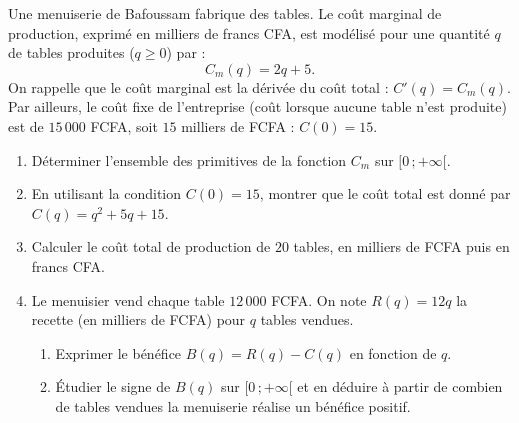\documentclass[11pt]{article}
\newcommand{\cle}[1]{{\popxbold\color{popdark}#1}}
\begin{document}
\begin{exercice}
Une menuiserie de Bafoussam fabrique des tables. Le \cle{coût marginal} de production, exprimé en milliers de francs CFA, est modélisé pour une quantité $q$ de tables produites ($q \geq 0$) par :
\[ C_m(q) = 2q + 5. \]
On rappelle que le coût marginal est la dérivée du \cle{coût total} : $C'(q) = C_m(q)$. Par ailleurs, le coût fixe de l'entreprise (coût lorsque aucune table n'est produite) est de $15\,000$ FCFA, soit $15$ milliers de FCFA : $C(0) = 15$.
\begin{enumerate}
\item Déterminer l'ensemble des primitives de la fonction $C_m$ sur $[0\,;+\infty[$.
\item En utilisant la condition $C(0) = 15$, montrer que le coût total est donné par $C(q) = q^2 + 5q + 15$.
\item Calculer le coût total de production de $20$ tables, en milliers de FCFA puis en francs CFA.
\item Le menuisier vend chaque table $12\,000$ FCFA. On note $R(q) = 12q$ la recette (en milliers de FCFA) pour $q$ tables vendues.
\begin{enumerate}
\item Exprimer le bénéfice $B(q) = R(q) - C(q)$ en fonction de $q$.
\item Étudier le signe de $B(q)$ sur $[0\,;+\infty[$ et en déduire à partir de combien de tables vendues la menuiserie réalise un bénéfice positif.
\end{enumerate}
\end{enumerate}
\end{exercice}
\end{document}
